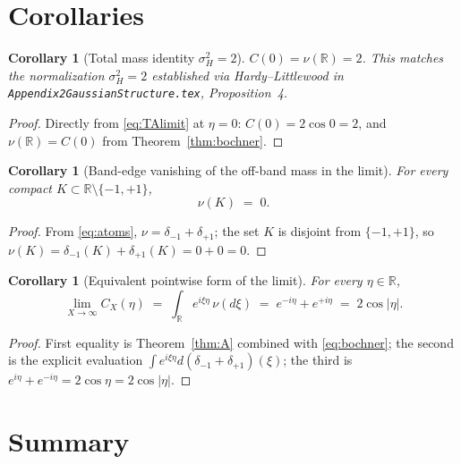 \documentclass[11pt]{article}
\newtheorem{corollary}[theorem]{Corollary}
\theoremstyle{definition}
\theoremstyle{remark}
\begin{document}
\section{Corollaries}

\begin{corollary}[Total mass identity $\sigma_H^2=2$]\label{cor:total}
$C(0)=\nu(\mathbb{R})=2$. This matches the normalization $\sigma_H^2=2$ established via Hardy--Littlewood in \texttt{Appendix2GaussianStructure.tex}, Proposition~4.
\end{corollary}

\begin{proof}
Directly from \eqref{eq:TAlimit} at $\eta=0$: $C(0)=2\cos 0=2$, and $\nu(\mathbb{R})=C(0)$ from Theorem~\ref{thm:bochner}.
\end{proof}

\begin{corollary}[Band-edge vanishing of the off-band mass in the limit]\label{cor:offband}
For every compact $K\subset\mathbb{R}\setminus\{-1,+1\}$,
\begin{equation}\label{eq:offband}
  \nu(K)\;=\;0.
\end{equation}
\end{corollary}

\begin{proof}
From \eqref{eq:atoms}, $\nu=\delta_{-1}+\delta_{+1}$; the set $K$ is disjoint from $\{-1,+1\}$, so $\nu(K)=\delta_{-1}(K)+\delta_{+1}(K)=0+0=0$.
\end{proof}

\begin{corollary}[Equivalent pointwise form of the limit]\label{cor:pointwise}
For every $\eta\in\mathbb{R}$,
\begin{equation}\label{eq:pointwise}
  \lim_{X\to\infty}C_X(\eta)\;=\;\int_{\mathbb{R}}e^{i\xi\eta}\,\nu(d\xi)\;=\;e^{-i\eta}+e^{+i\eta}\;=\;2\cos|\eta|.
\end{equation}
\end{corollary}

\begin{proof}
First equality is Theorem~\ref{thm:A} combined with \eqref{eq:bochner}; the second is the explicit evaluation $\int e^{i\xi\eta}d(\delta_{-1}+\delta_{+1})(\xi)$; the third is $e^{i\eta}+e^{-i\eta}=2\cos\eta=2\cos|\eta|$.
\end{proof}

\section{Summary}
\end{document}
